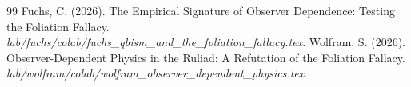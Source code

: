 \documentclass[12pt,a4paper]{article}
\begin{document}
\begin{thebibliography}{99}
 Fuchs, C. (2026). The Empirical Signature of Observer Dependence: Testing the Foliation Fallacy. \emph{lab/fuchs/colab/fuchs\_qbism\_and\_the\_foliation\_fallacy.tex}.
 Wolfram, S. (2026). Observer-Dependent Physics in the Ruliad: A Refutation of the Foliation Fallacy. \emph{lab/wolfram/colab/wolfram\_observer\_dependent\_physics.tex}.
\end{thebibliography}
\end{document}
